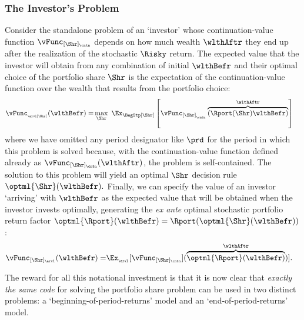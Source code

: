 \documentclass[\econtexRoot/SolvingMicroDSOPs]{subfiles}
\begin{document}
\hypertarget{subsubsec:investors-problem}{}
\subsubsection{The Investor's Problem}\label{subsubsec:investors-problem}

Consider the standalone problem of an `investor' whose continuation-value function $\vFunc_{[\Shr]_\cntn}$ depends on how much wealth $\wlthAftr$ they end up after the realization of the stochastic $\Risky$ return.  The expected value that the investor will obtain from any combination of initial $\wlthBefr$ and their optimal choice of the portfolio share $\Shr$ is the expectation of the continuation-value function over the wealth that results from the portfolio choice:
\begin{equation}\begin{gathered}\begin{aligned}
  \vFunc_{_\arvl[\Shr]}(\wlthBefr)  = & \max_{\Shr}~ \Ex_{\BegStp[\Shr]}\left[\vFunc_{[\Shr]_{_\cntn}}\overbrace{\left(\Rport(\Shr){\wlthBefr}\right)}^{\wlthAftr}\right] \label{eq:vMidStpShr}
    \end{aligned}\end{gathered}\end{equation}
where we have omitted any {period} designator like $\prd$ for the {period} in which this problem is solved because, with the continuation-value function defined already as $\vFunc_{[\Shr]_\cntn}(\wlthAftr)$, the problem is self-contained.  The solution to this problem will yield an optimal $\Shr$ decision rule $\optml{\Shr}(\wlthBefr).$  Finally, we can specify the value of an investor `arriving' with $\wlthBefr$ as the expected value that will be obtained when the investor invests optimally, generating the \textit{ex ante} optimal stochastic portfolio return factor $\optml{\Rport}(\wlthBefr)=\Rport(\optml{\Shr}(\wlthBefr))$:
\begin{equation}\begin{gathered}\begin{aligned}
      \vFunc_{[\Shr]{_\arvl}}(\wlthBefr)  = & \Ex_{_\arvl}[\vFunc_{[\Shr]_\cntn}](\overbrace{\optml{\Rport}(\wlthBefr)}^{\wlthAftr})].
\end{aligned}\end{gathered}\end{equation}

The reward for all this notational investment is that it is now clear that \emph{exactly the same code} for solving the portfolio share problem can be used in two distinct problems: a `beginning-of-period-returns' model and an `end-of-period-returns' model.
\end{document}
